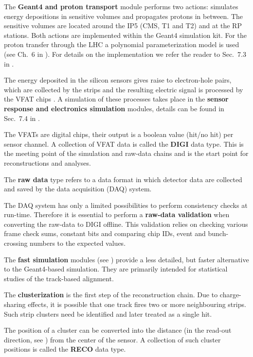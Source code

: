 \> The {\bf Geant4 and proton transport} module performs two actions: simulates energy depositions in sensitive volumes and propagates protons in between. The sensitive volumes are located around the IP5 (CMS, T1 and T2) and at the RP stations. Both actions are implemented within the Geant4  simulation kit. For the proton transfer through the LHC a polynomial parameterization model is used (see Ch.~6 in ). For details on the implementation we refer the reader to Sec.~7.3 in .

\> The energy deposited in the silicon sensors gives raise to electron-hole pairs, which are collected by the strips and the resulting electric signal is processed by the VFAT chips . A simulation of these processes takes place in the {\bf sensor response and electronics simulation} modules, details can be found in Sec.~7.4 in .

\> The VFATs are digital chips, their output is a boolean value (hit/no hit) per sensor channel. A collection of VFAT data is called the {\bf DIGI} data type. This is the meeting point of the simulation and raw-data chains and is the start point for reconstructions and analyses.

\> The {\bf raw data} type refers to a data format in which detector data are collected and saved by the data acquisition (DAQ) system.

\> The DAQ system has only a limited possibilities to perform consistency checks at run-time. Therefore it is essential to perform a {\bf raw-data validation} when converting the raw-data to DIGI offline. This validation relies on checking various frame check sums, constant bits and comparing chip IDs, event and bunch-crossing numbers to the expected values.

\> The {\bf fast simulation} modules (see ) provide a less detailed, but faster alternative to the Geant4-based simulation. They are primarily intended for statistical studies of the track-based alignment.

\> The {\bf clusterization} is the first step of the reconstruction chain. Due to charge-sharing effects, it is possible that one track fires two or more neighbouring strips. Such strip clusters need be identified and later treated as a single hit.

\> The position of a cluster can be converted into the distance (in the read-out direction, see ) from the center of the sensor. A collection of such cluster positions is called the {\bf RECO} data type.

